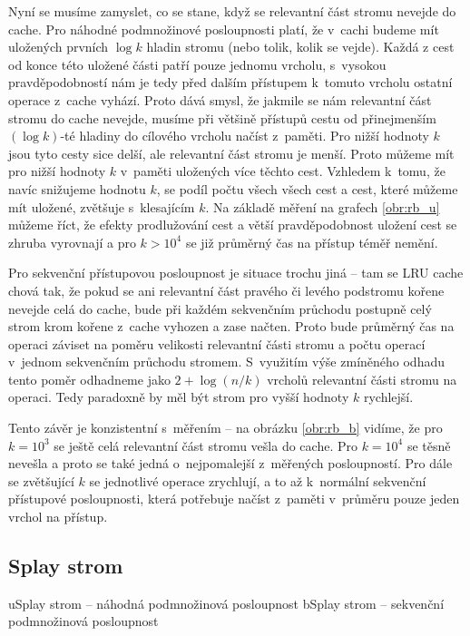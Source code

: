 Nyní se musíme zamyslet, co se stane, když se relevantní část stromu nevejde do
cache. Pro náhodné podmnožinové posloupnosti platí, že v~cachi budeme mít
uložených prvních $\log k$ hladin stromu (nebo tolik, kolik se vejde). Každá z cest od
konce této uložené části patří pouze jednomu vrcholu, s~vysokou
pravděpodobností nám je tedy před dalším přístupem k~tomuto vrcholu ostatní
operace z~cache vyhází. Proto dává smysl, že jakmile se nám relevantní část
stromu do cache nevejde, musíme při většině přístupů cestu od přinejmenším
$(\log k)$-té hladiny do cílového vrcholu načíst z~paměti. Pro nižší
hodnoty $k$ jsou tyto cesty sice delší, ale relevantní část stromu je menší.
Proto můžeme mít pro nižší hodnoty $k$ v~paměti uložených více těchto cest.
Vzhledem k~tomu, že navíc snižujeme hodnotu $k$, se podíl počtu všech všech
cest a cest, které můžeme mít uložené, zvětšuje s~klesajícím $k$. Na základě
měření na grafech \ref{obr:rb_u} můžeme říct, že efekty prodlužování cest a
větší pravděpodobnost uložení cest se zhruba vyrovnají a pro $k >  10^4$
se již průměrný čas na přístup téměř nemění.

Pro sekvenční přístupovou posloupnost je situace trochu jiná -- tam se LRU
cache chová tak, že pokud se ani relevantní část pravého či levého podstromu
kořene nevejde celá do cache, bude při každém sekvenčním průchodu postupně celý
strom krom kořene z~cache vyhozen a zase načten. Proto bude průměrný čas na
operaci záviset na poměru velikosti relevantní části stromu a počtu operací
v~jednom sekvenčním průchodu stromem. S~využitím  výše zmíněného odhadu tento poměr
odhadneme jako $2 + \log(n/k)$ vrcholů relevantní části stromu na operaci. Tedy
paradoxně by měl být strom pro vyšší hodnoty $k$ rychlejší.

Tento závěr je konzistentní s~měřením -- na obrázku \ref{obr:rb_b} vidíme, že pro $k=10^3$ se
ještě celá relevantní část stromu vešla do cache. Pro $k= 10^4$ se
těsně nevešla a proto se také jedná o~nejpomalejší z~měřených posloupností. Pro
dále se zvětšující $k$ se jednotlivé operace zrychlují, a to až k~normální
sekvenční přístupové posloupnosti, která potřebuje načíst z~paměti v~průměru
pouze jeden vrchol na přístup. 

\subsection{Splay strom}

u{Splay strom -- náhodná podmnožinová posloupnost}
b{Splay strom -- sekvenční podmnožinová posloupnost}


